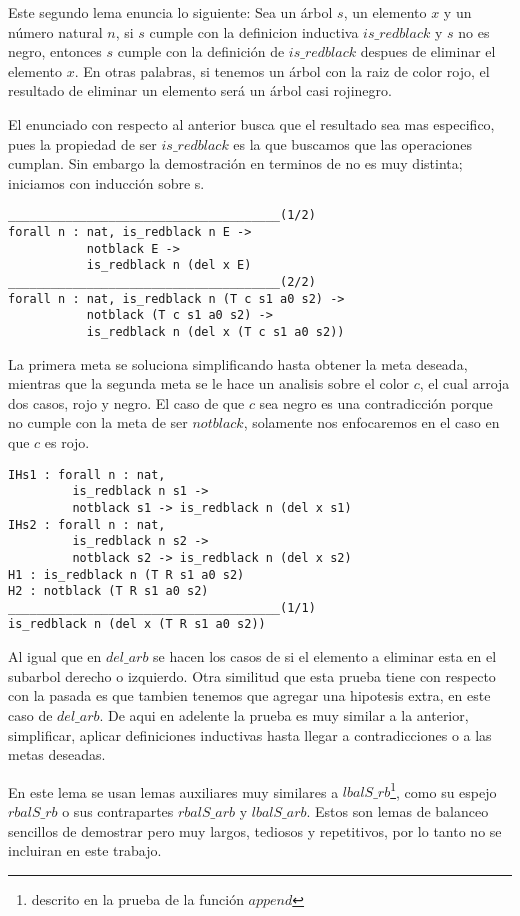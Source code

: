 Este segundo lema enuncia lo siguiente: Sea un \'arbol $s$, un elemento $x$ y un n\'umero natural
$n$, si $s$ cumple con la definicion inductiva $is\_redblack$ y $s$ no es negro, entonces $s$
cumple con la definición de $is\_redblack$ despues de eliminar el elemento $x$. En otras palabras,
si tenemos un \'arbol con la raiz de color rojo, el resultado de eliminar un elemento ser\'a un
\'arbol casi rojinegro.

El enunciado con respecto al anterior busca que el resultado sea mas especifico, pues la propiedad
de ser $is\_redblack$ es la que buscamos que las operaciones cumplan. Sin embargo la demostraci\'on
en terminos de {\coq} no es muy distinta; iniciamos con inducci\'on sobre s.

\begin{verbatim}
______________________________________(1/2)
forall n : nat, is_redblack n E ->
           notblack E ->
           is_redblack n (del x E)
______________________________________(2/2)
forall n : nat, is_redblack n (T c s1 a0 s2) ->
           notblack (T c s1 a0 s2) ->
           is_redblack n (del x (T c s1 a0 s2))
\end{verbatim}

La primera meta se soluciona simplificando hasta obtener la meta deseada, mientras que la segunda
meta se le hace un analisis sobre el color $c$, el cual arroja dos casos, rojo y negro. El caso de
que $c$ sea negro es una contradicci\'on porque no cumple con la meta de ser $notblack$, solamente
nos enfocaremos en el caso en que $c$ es rojo.

\begin{verbatim}
IHs1 : forall n : nat,
         is_redblack n s1 ->
         notblack s1 -> is_redblack n (del x s1)
IHs2 : forall n : nat,
         is_redblack n s2 ->
         notblack s2 -> is_redblack n (del x s2)
H1 : is_redblack n (T R s1 a0 s2)
H2 : notblack (T R s1 a0 s2)
______________________________________(1/1)
is_redblack n (del x (T R s1 a0 s2))
\end{verbatim}

Al igual que en $del\_arb$ se hacen los casos de si el elemento a eliminar esta en el subarbol
derecho o izquierdo. Otra similitud que esta prueba tiene con respecto con la pasada es que tambien
tenemos que agregar una hipotesis extra, en este caso de $del\_arb$. De aqui en adelente la prueba
es muy similar a la anterior, simplificar, aplicar definiciones inductivas hasta llegar a
contradicciones o a las metas deseadas.

En este lema se usan lemas auxiliares muy similares a $lbalS\_rb$\footnote{descrito en la prueba de
la  funci\'on $append$}, como su espejo $rbalS\_rb$ o sus contrapartes $rbalS\_arb$ y $lbalS\_arb$.
Estos son lemas de balanceo sencillos de demostrar pero muy largos, tediosos y repetitivos, por lo
tanto no se incluiran en este trabajo.


